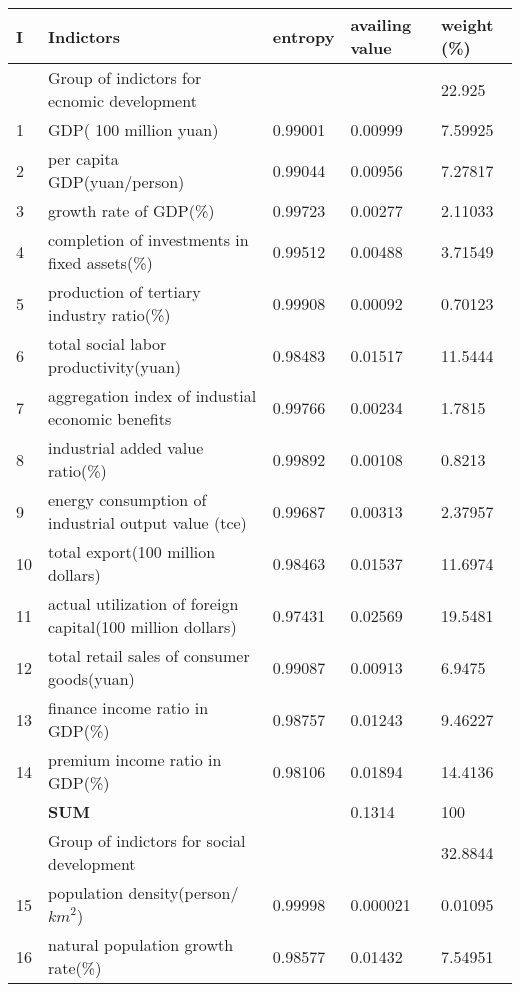 \documentclass{mcmthesis}
\begin{document}
\begin{table}
\setlength{\abovecaptionskip}{0pt}
\setlength{\belowcaptionskip}{0pt}
\centering
{}
\begin{tabular}{p{0.4cm}|p{9cm}|p{1.5cm}|p{1.5cm}|p{1.7cm}}
\hline
\bf I	& {\bf Indictors}			 &  \bf entropy		& \bf availing value		& \bf weight (\%) \\	
\hline
\rowcolor[gray]{0.9}	& Group of indictors for ecnomic development			& 		& 		& 22.925 \\	
\hline
 1		& GDP( 100 million yuan)		& 0.99001		& 0.00999		& 7.59925 \\	
2		& per capita GDP(yuan/person)		& 0.99044		& 0.00956		& 7.27817 \\	
3		& growth rate of GDP(\%)		& 0.99723		& 0.00277		& 2.11033 \\	
4		& completion of investments in fixed assets(\%)		& 0.99512		& 0.00488		& 3.71549 \\	
5		& production of tertiary industry ratio(\%)		& 0.99908		& 0.00092		& 0.70123 \\	
6		& total social labor productivity(yuan)		& 0.98483		& 0.01517		& 11.5444 \\	
7		& aggregation index of industial economic benefits		& 0.99766		& 0.00234		& 1.7815 \\	
8		& industrial added value ratio(\%)		& 0.99892		& 0.00108		& 0.8213 \\	
9		&energy consumption of industrial output value (tce)		& 0.99687		& 0.00313		& 2.37957 \\	
10		& total export(100 million dollars)		& 0.98463		& 0.01537		& 11.6974 \\	
11		& actual utilization of foreign capital(100 million dollars)		& 0.97431		& 0.02569		& 19.5481 \\	
12		& total retail sales of consumer goods(yuan)		& 0.99087		& 0.00913		& 6.9475 \\	
13		& finance income ratio in GDP(\%)		& 0.98757		& 0.01243		& 9.46227 \\	
14		& premium income ratio in GDP(\%)		& 0.98106		& 0.01894		& 14.4136 \\	
	&\bf  SUM			& 		& 0.1314		& 100 \\	
\hline
\rowcolor[gray]{0.9}	& Group of indictors for social development			& 		& 		& 32.8844 \\	
\hline
15		& population density(person/${km}^2$)		& 0.99998		& 0.000021		& 0.01095 \\	
16		& natural population growth rate(\%)		& 0.98577		& 0.01432		& 7.54951 \\	

\end{tabular}
\end{table}
\end{document}
